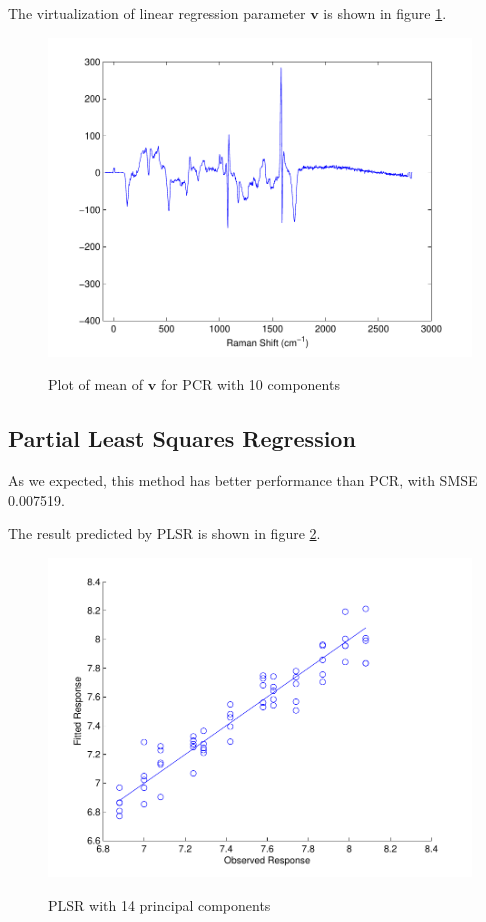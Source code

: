 \documentclass[a4paper]{article}
\newcommand{\bfv}{\mathbf{v}}
\begin{document}
The virtualization of linear regression parameter $\bfv$ is shown in figure \ref{pic5}.
\begin{figure}[h]
  \centering
  \includegraphics[width=.6\textwidth]{images/v_pcrnormcmp10smse008401.pdf}\\
  \caption{Plot of mean of $\bfv$ for PCR with 10 components}\label{pic5}
\end{figure}

\subsection{Partial Least Squares Regression}
As we expected, this method has better performance than PCR, with SMSE 0.007519. 

The result predicted by PLSR is shown in figure \ref{pic6}.
\begin{figure}[h]
  \centering
  \includegraphics[width=.6\textwidth]{images/pred_plsrnormcmp14smse007519.pdf}\\
  \caption{PLSR with 14 principal components}\label{pic6}
\end{figure}
\end{document}
